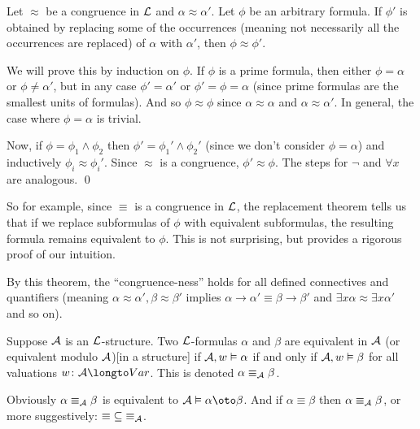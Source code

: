 \bthrm[title=The Replacement Theorem, name=replacementtheorem]

    Let $\approx$ be a congruence in ${\cal L}$ and $\alpha\approx\alpha'$.
    Let $\phi$ be an arbitrary formula.
    If $\phi'$ is obtained by replacing some of the occurrences (meaning not necessarily all the occurrences are replaced) of $\alpha$ with $\alpha'$, then $\phi\approx\phi'$.

\ethrm

We will prove this by induction on $\phi$.
If $\phi$ is a prime formula, then either $\phi=\alpha$ or $\phi\neq\alpha'$, but in any case $\phi'=\alpha'$ or $\phi'=\phi=\alpha$ (since prime formulas are the smallest units of formulas).
And so $\phi\approx\phi$ since $\alpha\approx\alpha$ and $\alpha\approx\alpha'$.
In general, the case where $\phi=\alpha$ is trivial.

Now, if $\phi=\phi_1\land\phi_2$ then $\phi'=\phi_1'\land\phi_2'$ (since we don't consider $\phi=\alpha$) and inductively $\phi_i\approx\phi_i'$.
Since $\approx$ is a congruence, $\phi'\approx\phi$.
The steps for $\neg$ and $\forall x$ are analogous.
\qed

So for example, since $\equiv$ is a congruence in ${\cal L}$, the replacement theorem tells us that if we replace subformulas of $\phi$ with equivalent subformulas, the resulting formula remains equivalent
to $\phi$.
This is not surprising, but provides a rigorous proof of our intuition.

By this theorem, the ``congruence-ness'' holds for all defined connectives and quantifiers (meaning $\alpha\approx\alpha',\beta\approx\beta'$ implies $\alpha\to\alpha'\equiv\beta\to\beta'$ and
$\exists x\alpha\approx\exists x\alpha'$ and so on).

\bdefn

    Suppose ${\cal A}$ is an ${\cal L}$-structure.
    Two ${\cal L}$-formulas $\alpha$ and $\beta$ are {\emphcolor equivalent in ${\cal A}$} (or {\emphcolor equivalent modulo ${\cal A}$})[in a structure] if ${\cal A},w\vDash\alpha$
    if and only if ${\cal A},w\vDash\beta$ for all valuations $w\colon{\cal A}\longto\Var$.
    This is denoted $\alpha\equiv_{\cal A}\beta$.

\edefn

Obviously $\alpha\equiv_{\cal A}\beta$ is equivalent to ${\cal A}\vDash\alpha\oto\beta$.
And if $\alpha\equiv\beta$ then $\alpha\equiv_{\cal A}\beta$, or more suggestively: ${\equiv}\subseteq{\equiv_{\cal A}}$.

\bprop

